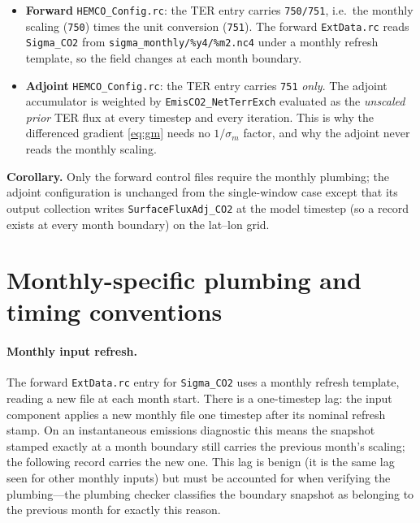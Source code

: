 \documentclass[11pt]{article}
\newcommand{\code}[1]{\texttt{#1}}
\begin{document}
\begin{itemize}[nosep]
  \item \textbf{Forward} \code{HEMCO\_Config.rc}: the TER entry carries
        \code{750/751}, i.e.\ the monthly scaling (\code{750}) times the unit
        conversion (\code{751}). The forward \code{ExtData.rc} reads
        \code{Sigma\_CO2} from \code{sigma\_monthly/\%y4/\%m2.nc4} under a monthly
        refresh template, so the field changes at each month boundary.
  \item \textbf{Adjoint} \code{HEMCO\_Config.rc}: the TER entry carries \code{751}
        \emph{only}. The adjoint accumulator is weighted by
        \code{EmisCO2\_NetTerrExch} evaluated as the \emph{unscaled prior} TER flux
        at every timestep and every iteration. This is why the differenced gradient
        \eqref{eq:gm} needs no $1/\sigma_m$ factor, and why the adjoint never reads
        the monthly scaling.
\end{itemize}

\noindent\textbf{Corollary.} Only the forward control files require the monthly
plumbing; the adjoint configuration is unchanged from the single-window case
except that its output collection writes \code{SurfaceFluxAdj\_CO2} at the model
timestep (so a record exists at every month boundary) on the lat--lon grid.

\section{Monthly-specific plumbing and timing conventions}

\paragraph{Monthly input refresh.} The forward \code{ExtData.rc} entry for
\code{Sigma\_CO2} uses a monthly refresh template, reading a new file at each month
start. There is a one-timestep lag: the input component applies a new monthly file
one timestep after its nominal refresh stamp. On an instantaneous emissions
diagnostic this means the snapshot stamped exactly at a month boundary still
carries the previous month's scaling; the following record carries the new one.
This lag is benign (it is the same lag seen for other monthly inputs) but must be
accounted for when verifying the plumbing---the plumbing checker classifies the
boundary snapshot as belonging to the previous month for exactly this reason.
\end{document}
